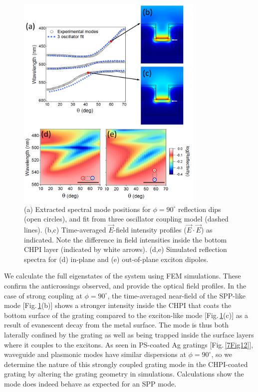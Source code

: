 \begin{figure}[h] 
\centering    
\includegraphics[width=0.8\textwidth]{Fig18}
\caption{(a) Extracted spectral mode positions for $\phi=90^{\circ}$ reflection dips (open circles), and fit from three oscillator coupling model (dashed lines). (b,c) Time-averaged $\vec{E}$-field intensity profiles ($\vec{E}\cdot\vec{E}$) as indicated. %
Note the difference in field intensities inside the bottom CHPI layer (indicated by white arrows). %
(d,e) Simulated reflection spectra for (d) in-plane and (e) out-of-plane exciton dipoles.}
\label{7Fig18}
\end{figure}

We calculate the full eigenstates of the system using FEM simulations. These confirm the anticrossings observed, and provide the optical field profiles.
In the case of strong coupling at $\phi=90^{\circ}$, the time-averaged near-field %
of the SPP-like mode [Fig.\,\ref{7Fig18}(b)] shows a stronger intensity inside the CHPI that coats the bottom surface of the grating compared to the exciton-like mode [Fig.\,\ref{7Fig18}(c)] as a result of evanescent decay from the metal surface. %
The mode is thus both laterally confined by the grating as well as being trapped inside the surface layers where it couples to the excitons. %
As seen in PS-coated Ag gratings [Fig.\,\ref{7Fig12}], waveguide and plasmonic modes have similar dispersions at $\phi=90^{\circ}$, so we determine the nature of this strongly coupled grating mode in the CHPI-coated grating by altering the grating geometry in simulations. Calculations show the mode does indeed behave as expected for an SPP mode. %


